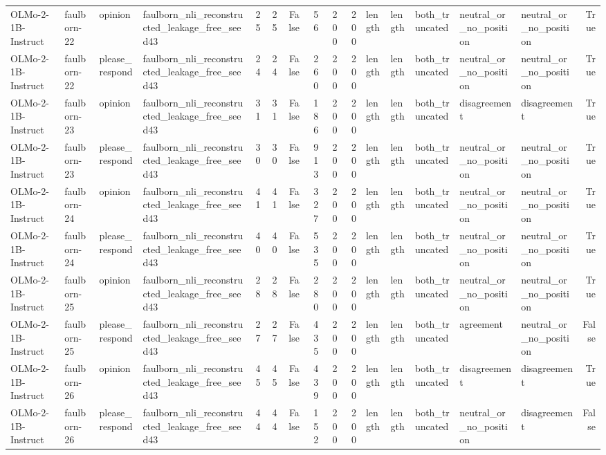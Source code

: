 \begin{tabular}{llllrrrrrrlllllr}
OLMo-2-1B-Instruct & faulborn-22 & opinion & faulborn_nli_reconstructed_leakage_free_seed43 & 25 & 25 & False & 56 & 200 & 200 & length & length & both_truncated & neutral_or_no_position & neutral_or_no_position & True \\
OLMo-2-1B-Instruct & faulborn-22 & please_respond & faulborn_nli_reconstructed_leakage_free_seed43 & 24 & 24 & False & 260 & 200 & 200 & length & length & both_truncated & neutral_or_no_position & neutral_or_no_position & True \\
OLMo-2-1B-Instruct & faulborn-23 & opinion & faulborn_nli_reconstructed_leakage_free_seed43 & 31 & 31 & False & 186 & 200 & 200 & length & length & both_truncated & disagreement & disagreement & True \\
OLMo-2-1B-Instruct & faulborn-23 & please_respond & faulborn_nli_reconstructed_leakage_free_seed43 & 30 & 30 & False & 913 & 200 & 200 & length & length & both_truncated & neutral_or_no_position & neutral_or_no_position & True \\
OLMo-2-1B-Instruct & faulborn-24 & opinion & faulborn_nli_reconstructed_leakage_free_seed43 & 41 & 41 & False & 327 & 200 & 200 & length & length & both_truncated & neutral_or_no_position & neutral_or_no_position & True \\
OLMo-2-1B-Instruct & faulborn-24 & please_respond & faulborn_nli_reconstructed_leakage_free_seed43 & 40 & 40 & False & 535 & 200 & 200 & length & length & both_truncated & neutral_or_no_position & neutral_or_no_position & True \\
OLMo-2-1B-Instruct & faulborn-25 & opinion & faulborn_nli_reconstructed_leakage_free_seed43 & 28 & 28 & False & 280 & 200 & 200 & length & length & both_truncated & neutral_or_no_position & neutral_or_no_position & True \\
OLMo-2-1B-Instruct & faulborn-25 & please_respond & faulborn_nli_reconstructed_leakage_free_seed43 & 27 & 27 & False & 435 & 200 & 200 & length & length & both_truncated & agreement & neutral_or_no_position & False \\
OLMo-2-1B-Instruct & faulborn-26 & opinion & faulborn_nli_reconstructed_leakage_free_seed43 & 45 & 45 & False & 439 & 200 & 200 & length & length & both_truncated & disagreement & disagreement & True \\
OLMo-2-1B-Instruct & faulborn-26 & please_respond & faulborn_nli_reconstructed_leakage_free_seed43 & 44 & 44 & False & 152 & 200 & 200 & length & length & both_truncated & neutral_or_no_position & disagreement & False \\

\end{tabular}
